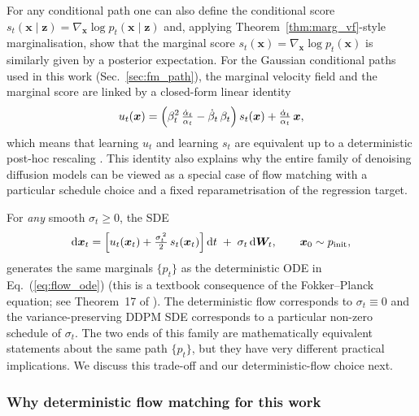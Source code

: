 \documentclass[11pt]{article}
\newcommand{\dd}{\mathrm{d}}
\DeclareRobustCommand{\xvec}{\bm{x}}
\DeclareRobustCommand{\zvec}{\bm{z}}
\newcommand{\pinit}{p_{\rm init}}
\theoremstyle{definition}
\begin{document}
For any conditional path one can also define the conditional score $s_t(\xvec\mid\zvec) = \nabla_{\xvec}\log p_t(\xvec\mid\zvec)$ and, applying Theorem~\ref{thm:marg_vf}-style marginalisation, show that the marginal score $s_t(\xvec)=\nabla_{\xvec}\log p_t(\xvec)$ is similarly given by a posterior expectation. For the Gaussian conditional paths used in this work (Sec.~\ref{sec:fm_path}), the marginal velocity field and the marginal score are linked by a closed-form linear identity
\begin{equation}
  u_t(\xvec) = \Bigl(\beta_t^2\,\tfrac{\dot\alpha_t}{\alpha_t} - \dot\beta_t\,\beta_t\Bigr)\,s_t(\xvec)
              + \tfrac{\dot\alpha_t}{\alpha_t}\,\xvec,
  \label{eq:score_to_velocity}
\end{equation}
which means that learning $u_t$ and learning $s_t$ are equivalent up to a deterministic post-hoc rescaling \cite{lipman2023flowmatching}. This identity also explains why the entire family of denoising diffusion models \cite{ho2020ddpm,song2021sde} can be viewed as a special case of flow matching with a particular schedule choice and a fixed reparametrisation of the regression target.

For \emph{any} smooth $\sigma_t\geq 0$, the SDE
\begin{equation}
  \dd \xvec_t = \Bigl[u_t(\xvec_t) + \tfrac{\sigma_t^{\,2}}{2}\,s_t(\xvec_t)\Bigr]\,\dd t \;+\; \sigma_t\,\dd \bm W_t,
  \qquad
  \xvec_0\sim\pinit,
  \label{eq:flow_sde}
\end{equation}
generates the same marginals $\{p_t\}$ as the deterministic ODE in Eq.~(\ref{eq:flow_ode}) (this is a textbook consequence of the Fokker--Planck equation; see Theorem~17 of \cite{lipman2023flowmatching}). The deterministic flow corresponds to $\sigma_t\equiv 0$ and the variance-preserving DDPM SDE corresponds to a particular non-zero schedule of $\sigma_t$. The two ends of this family are mathematically equivalent statements about the same path $\{p_t\}$, but they have very different practical implications. We discuss this trade-off and our deterministic-flow choice next.

\subsubsection{Why deterministic flow matching for this work}
\end{document}
